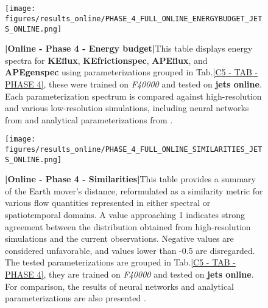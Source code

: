 %
%
\newpage
\thispagestyle{empty}
\part{}
\newpage

%
%
\newpage

\begin{figure}[H]
    \centering
    \texttt{[image: figures/results\_online/PHASE\_4\_FULL\_ONLINE\_ENERGYBUDGET\_JETS\_ONLINE.png]}
    \caption{\textbf{|}\textcolor{section_color}{\textbf{Online - Phase 4 - Energy budget}}\textbf{|}This table displays energy spectra for \textbf{KEflux}, \textbf{KEfrictionspec}, \textbf{APEflux}, and \textbf{APEgenspec} using parameterizations grouped in Tab.\ref{C5 - TAB - PHASE 4}, these were trained on \textit{F40000} and tested on \textbf{jets online}. Each parameterization spectrum is compared against high-resolution and various low-resolution simulations, including neural networks from \cite{Benchmarking} and analytical parameterizations from \cite{ClosureAnalytical2, ClosureAnalytical51, ClosureDataDrivenZanna}.
}
    \label{APP - ONLINE - PHASE 4 - ENERGY BUDGET -  FULL 40000 and JETS ONLINE}
\end{figure}

%
%
\newpage

\begin{figure}[H]
    \centering
    \texttt{[image: figures/results\_online/PHASE\_4\_FULL\_ONLINE\_SIMILARITIES\_JETS\_ONLINE.png]}
    \caption{\textbf{|}\textcolor{section_color}{\textbf{Online - Phase 4 - Similarities}}\textbf{|}This table provides a summary of the Earth mover's distance, reformulated as a similarity metric for various flow quantities represented in either spectral or spatiotemporal domains. A value approaching 1 indicates strong agreement between the distribution obtained from high-resolution simulations and the current observations. Negative values are considered unfavorable, and values lower than -0.5 are disregarded. The tested parameterizations are grouped in Tab.\ref{C5 - TAB - PHASE 4}, they are trained on \textit{F40000} and tested on \textbf{jets online}. For comparison, the results of neural networks \citep{Benchmarking} and analytical parameterizations are also presented \citep{ClosureAnalytical2, ClosureAnalytical51, ClosureDataDrivenZanna}.}
    \label{APP - ONLINE - PHASE 4 - SIMILARITIES -  FULL 40000 and JETS ONLINE}
\end{figure}

